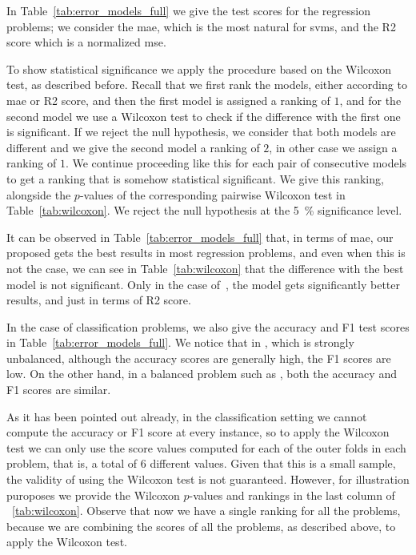In Table~\ref{tab:error_models_full} we give the test scores for the regression problems; we consider the \acrshort{mae}, which is the most natural for \acrshort{svms}, and the R2 score which is a normalized \acrshort{mse}.

To show statistical significance we apply the procedure based on the Wilcoxon test, as described before. Recall that we first rank the models, either according to \acrshort{mae} or R2 score, and then the first model is assigned a ranking of $1$, and for the second model we use a Wilcoxon test to check if the difference with the first one is significant. If we reject the null hypothesis, we consider that both models are different and we give the second model a ranking of $2$, in other case we assign a ranking of $1$. We continue proceeding like this for each pair of consecutive models to get a ranking that is somehow statistical significant. We give this ranking, alongside the $p$-values of the corresponding pairwise Wilcoxon test in Table~\ref{tab:wilcoxon}.
%
 We 
 reject the null hypothesis at the \SI{5}{\percent} significance level.
%

It can be observed in Table~\ref{tab:error_models_full} that, in terms of \acrshort{mae}, our proposed  gets the best results in most regression problems, and even when this is not the case, we can see in Table~\ref{tab:wilcoxon} that the difference with the best model is not significant. Only in the case of~, the  model gets significantly better results, and just in terms of R2 score.
%

In the case of classification problems, we also give the accuracy and F1 test scores in Table~\ref{tab:error_models_full}. We notice that in , which is strongly unbalanced, although the accuracy scores are generally high, the F1 scores are low. On the other hand, in a balanced problem such as , both the accuracy and F1 scores are similar.
%

As it has been pointed out already, in the classification setting we cannot compute the accuracy or F1 score at every instance, so to apply the Wilcoxon test we can only use the score values computed for each of the outer folds in each problem, that is, a total of $6$ different values.
Given that this is a small sample, the validity of using the Wilcoxon test is not guaranteed. However, for illustration puroposes we provide the Wilcoxon $p$-values and rankings in the last column of ~\ref{tab:wilcoxon}. Observe that now we have a single ranking for all the problems, because we are combining the scores of all the problems, as described above, to apply the Wilcoxon test.


